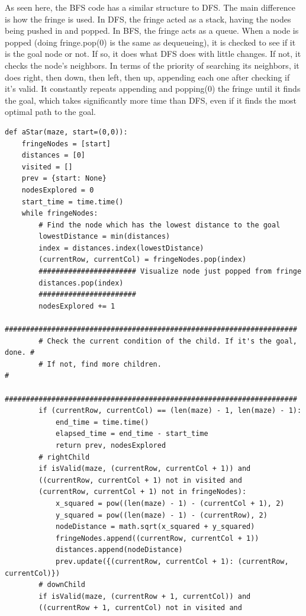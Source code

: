 \documentclass[11pt]{article}
\begin{document}
As seen here, the BFS code has a similar structure to DFS. The main difference is how the fringe is used. In DFS, the fringe acted as a stack, having the nodes being pushed in and popped. In BFS, the fringe acts as a queue. When a node is popped (doing fringe.pop(0) is the same as dequeueing), it is checked to see if it is the goal node or not. If so, it does what DFS does with little changes. If not, it checks the node's neighbors. In terms of the priority of searching its neighbors, it does right, then down, then left, then up, appending each one after checking if it's valid. It constantly repeats appending and popping(0) the fringe until it finds the goal, which takes significantly more time than DFS, even if it finds the most optimal path to the goal.

\begin{verbatim}
def aStar(maze, start=(0,0)):
    fringeNodes = [start]
    distances = [0]
    visited = []
    prev = {start: None}
    nodesExplored = 0
    start_time = time.time()
    while fringeNodes:
        # Find the node which has the lowest distance to the goal
        lowestDistance = min(distances)
        index = distances.index(lowestDistance)
        (currentRow, currentCol) = fringeNodes.pop(index)
        ####################### Visualize node just popped from fringe
        distances.pop(index)
        #######################
        nodesExplored += 1
        #####################################################################
        # Check the current condition of the child. If it's the goal, done. #
        # If not, find more children.                                       #
        #####################################################################
        if (currentRow, currentCol) == (len(maze) - 1, len(maze) - 1):
            end_time = time.time()
            elapsed_time = end_time - start_time
            return prev, nodesExplored
        # rightChild
        if isValid(maze, (currentRow, currentCol + 1)) and 
        ((currentRow, currentCol + 1) not in visited and 
        (currentRow, currentCol + 1) not in fringeNodes):
            x_squared = pow((len(maze) - 1) - (currentCol + 1), 2)
            y_squared = pow((len(maze) - 1) - (currentRow), 2)
            nodeDistance = math.sqrt(x_squared + y_squared)
            fringeNodes.append((currentRow, currentCol + 1))
            distances.append(nodeDistance)
            prev.update({(currentRow, currentCol + 1): (currentRow, currentCol)})
        # downChild
        if isValid(maze, (currentRow + 1, currentCol)) and 
        ((currentRow + 1, currentCol) not in visited and 

\end{verbatim}
\end{document}
